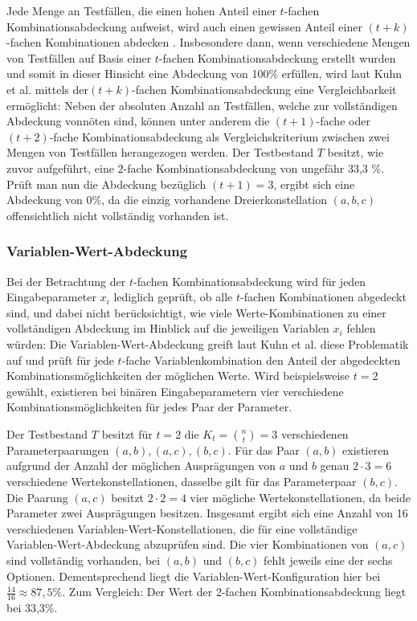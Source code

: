 Jede Menge an Testfällen, die einen hohen Anteil einer $t$-fachen Kombinationsabdeckung aufweist, wird auch einen gewissen Anteil einer $(t+k)$-fachen Kombinationen abdecken \cite{kuhn2010practical}. Insbesondere dann, wenn verschiedene Mengen von Testfällen auf Basis einer $t$-fachen Kombinationsabdeckung erstellt wurden und somit in dieser Hinsicht eine Abdeckung von 100\% erfüllen, wird laut Kuhn et al. \cite{kuhn2010practical} mittels der$(t+k)$-fachen Kombinationsabdeckung eine Vergleichbarkeit ermöglicht: Neben der absoluten Anzahl an Testfällen, welche zur vollständigen Abdeckung vonnöten sind, können unter anderem die $(t+1)$-fache oder $(t+2)$-fache Kombinationsabdeckung als Vergleichskriterium zwischen zwei Mengen von Testfällen herangezogen werden. Der Testbestand $T$ besitzt, wie zuvor aufgeführt, eine $2$-fache Kombinationsabdeckung von ungefähr 33,3 \%. Prüft man nun die Abdeckung bezüglich $(t+1) = 3$, ergibt sich eine Abdeckung von 0\%, da die einzig vorhandene Dreierkonstellation $(a,b,c)$ offensichtlich nicht vollständig vorhanden ist.  

\subsubsection{Variablen-Wert-Abdeckung}\label{subsub:variablenWert}

Bei der Betrachtung der $t$-fachen Kombinationsabdeckung wird für jeden Eingabeparameter $x_i$ lediglich geprüft, ob alle $t$-fachen Kombinationen abgedeckt sind, und dabei nicht berücksichtigt, wie viele Werte-Kombinationen zu einer vollständigen Abdeckung im Hinblick auf die jeweiligen Variablen $x_i$ fehlen würden: Die Variablen-Wert-Abdeckung greift laut Kuhn et al. \cite{kuhn2010practical} diese Problematik auf und prüft für jede $t$-fache Variablenkombination den Anteil der abgedeckten Kombinationsmöglichkeiten der möglichen Werte. Wird beispielsweise $t=2$ gewählt, existieren bei binären Eingabeparametern vier verschiedene Kombinationsmöglichkeiten für jedes Paar der Parameter.
  

Der Testbestand $T$ besitzt für $t=2$ die $K_t = \binom{n}{t} = 3$ verschiedenen Parameterpaarungen $(a,b), (a,c), (b,c)$. Für das Paar $(a,b)$ existieren aufgrund der Anzahl der möglichen Ausprägungen von $a$ und $b$ genau $2 \cdot 3 = 6$ verschiedene Wertekonstellationen, dasselbe gilt für das Parameterpaar $(b,c)$. Die Paarung $(a,c)$ besitzt $2 \cdot 2 = 4$ vier mögliche Wertekonstellationen, da beide Parameter zwei Ausprägungen besitzen. Insgesamt ergibt sich eine Anzahl von 16 verschiedenen Variablen-Wert-Konstellationen, die für eine vollständige Variablen-Wert-Abdeckung abzuprüfen sind. Die vier Kombinationen von $(a,c)$ sind vollständig vorhanden, bei $(a,b)$ und $(b,c)$ fehlt jeweils eine der sechs Optionen. Dementsprechend liegt die Variablen-Wert-Konfiguration hier bei $\frac{14}{16} \approx 87,5 \%$. Zum Vergleich: Der Wert der 2-fachen Kombinationsabdeckung liegt bei 33,3\%.

